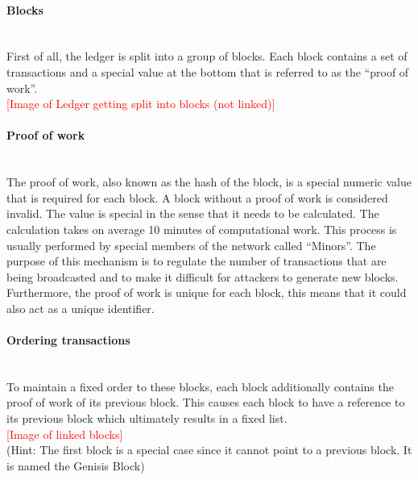 \documentclass[a4paper, 12pt]{report}
\begin{document}
\paragraph{Blocks} \hspace{0pt} \\
First of all, the ledger is split into a group of blocks. Each block contains a set of transactions and a special value at the bottom that is referred to as the “proof of work”. 
\\ \textcolor{red}{[Image of Ledger getting split into blocks (not linked)]} \\
\paragraph{Proof of work} \hspace{0pt} \\
The proof of work, also known as the hash of the block, is a special numeric value that is required for each block. A block without a proof of work is considered invalid. The value is special in the sense that it needs to be calculated. The calculation takes on average 10 minutes of computational work. This process is usually performed by special members of the network called “Minors”. The purpose of this mechanism is to regulate the number of transactions that are being broadcasted and to make it difficult for attackers to generate new blocks. Furthermore, the proof of work is unique for each block, this means that it could also act as a unique identifier.
\paragraph{Ordering transactions} \hspace{0pt} \\
To maintain a fixed order to these blocks, each block additionally contains the proof of work of its previous block. This causes each block to have a reference to its previous block which ultimately results in a fixed list.
\\ \textcolor{red}{[Image of linked blocks]} \\
(Hint: The first block is a special case since it cannot point to a previous block. It is named the Genisis Block)
\end{document}
